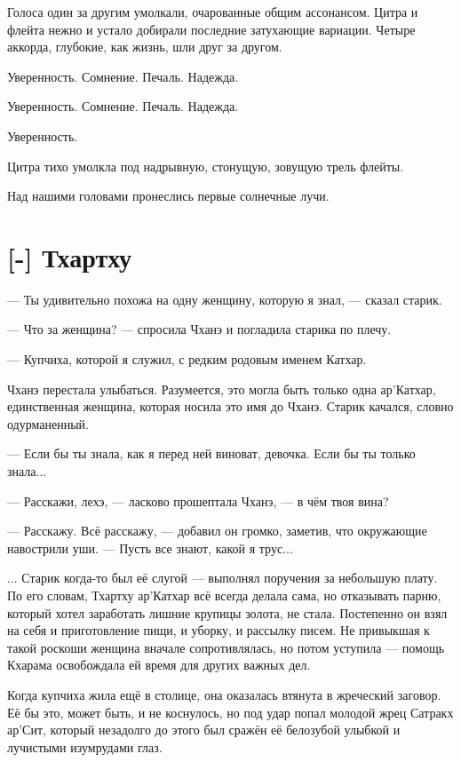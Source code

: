 Голоса один за другим умолкали, очарованные общим ассонансом.
Цитра и флейта нежно и устало добирали последние затухающие вариации.
Четыре аккорда, глубокие, как жизнь, шли друг за другом.

Уверенность. Сомнение. Печаль. Надежда.

Уверенность. Сомнение. Печаль. Надежда.

Уверенность.

Цитра тихо умолкла под надрывную, стонущую, зовущую трель флейты.

Над нашими головами пронеслись первые солнечные лучи.

\section{[-] Тхартху}

\textspace

--- Ты удивительно похожа на одну женщину, которую я знал, --- сказал старик.

--- Что за женщина? --- спросила Чханэ и погладила старика по плечу.

--- Купчиха, которой я служил, с редким родовым именем Катхар.

Чханэ перестала улыбаться.
Разумеется, это могла быть только одна ар’Катхар, единственная женщина, которая носила это имя до Чханэ.
Старик качался, словно одурманенный.

--- Если бы ты знала, как я перед ней виноват, девочка.
Если бы ты только знала...

--- Расскажи, лехэ, --- ласково прошептала Чханэ, --- в чём твоя вина?

--- Расскажу.
Всё расскажу, --- добавил он громко, заметив, что окружающие навострили уши.
--- Пусть все знают, какой я трус...

... Старик когда-то был её слугой --- выполнял поручения за небольшую плату.
По его словам, Тхартху ар’Катхар всё всегда делала сама, но отказывать парню, который хотел заработать лишние крупицы золота, не стала.
Постепенно он взял на себя и приготовление пищи, и уборку, и рассылку писем.
Не привыкшая к такой роскоши женщина вначале сопротивлялась, но потом уступила --- помощь Кхарама освобождала ей время для других важных дел.

Когда купчиха жила ещё в столице, она оказалась втянута в жреческий заговор.
Её бы это, может быть, и не коснулось, но под удар попал молодой жрец Сатракх ар’Сит, который незадолго до этого был сражён её белозубой улыбкой и лучистыми изумрудами глаз.

